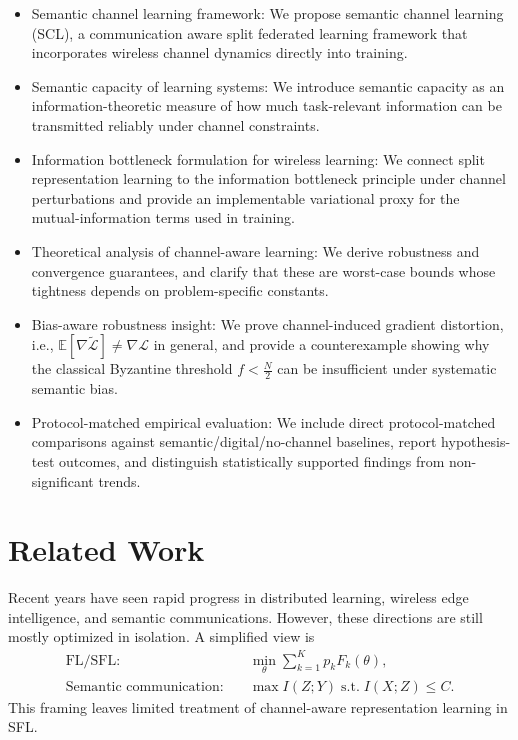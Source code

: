 \documentclass[10pt,journal]{IEEEtran}
\begin{document}
\begin{itemize}

\item Semantic channel learning framework:
We propose semantic channel learning (SCL), a communication aware split federated learning framework that incorporates wireless channel dynamics directly into training.
\item Semantic capacity of learning systems:
We introduce semantic capacity as an information-theoretic measure of how much task-relevant information can be transmitted reliably under channel constraints.
\item Information bottleneck formulation for wireless learning:
We connect split representation learning to the information bottleneck principle under channel perturbations and provide an implementable variational proxy for the mutual-information terms used in training.
\item Theoretical analysis of channel-aware learning:
We derive robustness and convergence guarantees, and clarify that these are worst-case bounds whose tightness depends on problem-specific constants.
\item Bias-aware robustness insight:
We prove channel-induced gradient distortion, i.e., $\mathbb{E}[\nabla \tilde{\mathcal{L}}] \neq \nabla \mathcal{L}$ in general, and provide a counterexample showing why the classical Byzantine threshold $f<\frac{N}{2}$ can be insufficient under systematic semantic bias.
\item Protocol-matched empirical evaluation:
We include direct protocol-matched comparisons against semantic/digital/no-channel baselines, report hypothesis-test outcomes, and distinguish statistically supported findings from non-significant trends.
\end{itemize}
\section{Related Work}
Recent years have seen rapid progress in distributed learning, wireless edge intelligence, and semantic communications\cite{9060868,8839651,10798108}. However, these directions are still mostly optimized in isolation\cite{10741277}. A simplified view is
\begin{equation}
\begin{aligned}
\text{FL/SFL:}\quad &\min_{\theta}\sum_{k=1}^{K}p_kF_k(\theta), \\
\text{Semantic communication:}\quad &\max I(Z;Y)\;\text{s.t.}\;I(X;Z)\le C.
\end{aligned}
\end{equation}
This framing leaves limited treatment of channel-aware representation learning in SFL.
\end{document}
